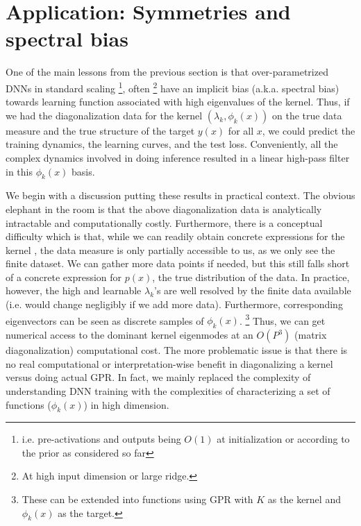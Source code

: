 \section{Application: Symmetries and spectral bias}
\label{Sec:Symmetries}
One of the main lessons from the previous section is that over-parametrized DNNs in standard scaling \footnote{i.e. pre-activations and outputs being $O(1)$ at initialization or according to the prior as considered so far}, often \footnote{At high input dimension or large ridge.} have an implicit bias (a.k.a. spectral bias) towards learning function associated with high eigenvalues of the kernel. Thus, if we had the diagonalization data for the kernel  $(\lambda_k,\phi_k(x))$ on the true data measure and the true structure of the target $y(x)$ for all $x$, we could predict the training dynamics, the learning curves, and the test loss. Conveniently, all the complex dynamics involved in doing inference resulted in a linear high-pass filter in this $\phi_k(x)$ basis. 

We begin with a discussion putting these results in practical context. The obvious elephant in the room is that the above diagonalization data is analytically intractable and computationally costly. Furthermore, there is a conceptual difficulty which is that, while we can readily obtain concrete expressions for the kernel \citep{lee2019wide}, the data measure is only partially accessible to us, as we only see the finite dataset. We can gather more data points if needed, but this still falls short of a concrete expression for $p(x)$, the true distribution of the data. In practice, however, the high and learnable $\lambda_k$'s are well resolved by the finite data available (i.e. would change negligibly if we add more data). Furthermore, corresponding eigenvectors can be seen as discrete samples of $\phi_k(x)$. \footnote{These can be extended into functions using GPR with $K$ as the kernel and $\phi_k(x)$ as the target.} Thus, we can get numerical access to the dominant kernel eigenmodes at an $O(P^3)$ (matrix diagonalization) computational cost. The more problematic issue is that there is no real computational or interpretation-wise benefit in diagonalizing a kernel versus doing actual GPR. In fact, we mainly replaced the complexity of understanding DNN training with the complexities of characterizing a set of functions  ($\phi_k(x)$) in high dimension. 

